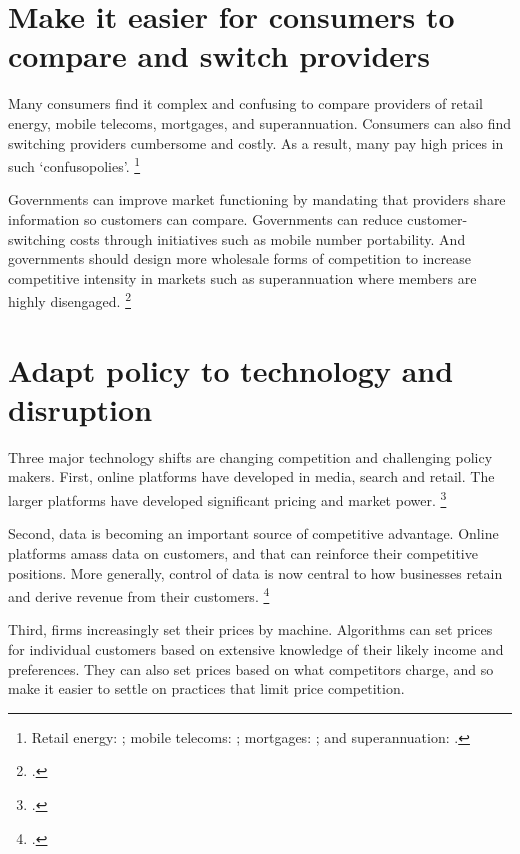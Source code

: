 \section {Make it easier for consumers to compare and switch providers}

Many consumers find it complex and confusing to compare providers of retail energy, mobile telecoms, mortgages, and superannuation. Consumers can also find switching providers cumbersome and costly. As a result, many pay high prices in such `confusopolies'.%
\footnote{Retail energy: \textcites{WoodBlowers-2017-price-shock}{Bendavid-cosmonaut-15}; mobile telecoms: \textcite{Gans-2005-Confusopoly}; mortgages: \textcite{Bankhaggle_2017}; and superannuation: \textcite{MinifieSavageCameron-2015-Super-savings}.} 
 
Governments can improve market functioning by mandating that providers share information so customers can compare. Governments can reduce customer-switching costs through initiatives such as mobile number portability. And governments should design more wholesale forms of competition to increase competitive intensity in markets such as superannuation where members are highly disengaged.%
\footcite{MinifieSavageCameron-2015-Super-savings}

\section{Adapt policy to technology and disruption}

Three major technology shifts are changing competition and challenging policy makers. First, online platforms have developed in media, search and retail. The larger platforms have developed significant pricing and market power.%
\footcites{EconData2017}

Second, data is becoming an important source of competitive advantage. Online platforms amass data on customers, and that can reinforce their competitive positions. More generally, control of data is now central to how businesses retain and derive revenue from their customers. \footcite{EconData2017}

Third, firms increasingly set their prices by machine. Algorithms can set prices for individual customers based on extensive knowledge of their likely income and preferences. They can also set prices based on what competitors charge, and so make it easier to settle on practices that limit price competition. 

